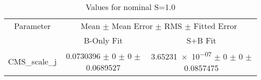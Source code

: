 \begin{table}
\centering
\caption{Values for nominal S=1.0}
\begin{tabular}{ccc}
\toprule
Parameter & \multicolumn{2}{c}{Mean $\pm$ Mean Error $\pm$ RMS $\pm$ Fitted Error}\\
 & B-Only Fit & S+B Fit\\
\midrule
CMS\_scale\_j & \num{0.0730396} $\pm$ \num{0} $\pm$ \num{0} $\pm$ \num{0.0689527} & \num{3.65231e-07} $\pm$ \num{0} $\pm$ \num{0} $\pm$ \num{0.0857475}\\
\bottomrule
\end{tabular}
\end{table}